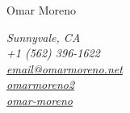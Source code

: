 \documentclass[11pt]{article}
\begin{document}
    \noindent
    \begin{minipage}[c]{0.5\textwidth}
        \begin{flushleft}
            \Huge{Omar Moreno}
        \end{flushleft}
    \end{minipage}
    \begin{minipage}[c]{0.50\textwidth}
        \begin{flushright}
            \color{dimgray} \em
            Sunnyvale, CA           \\
            \faMobilePhone \hspace{1pt} +1 (562) 396-1622       \\
            \faEnvelope \hspace{1pt} \href{mailto:email@omarmoreno.net}{email@omarmoreno.net}             \\
            \faLinkedin \hspace{1pt} \href{https://www.linkedin.com/in/omarmoreno2}{omarmoreno2}          \\
            \faGithub \hspace{1pt} \href{https://github.com/omar-moreno}{omar-moreno}                     \\
        \end{flushright}
    \end{minipage}
\end{document}
